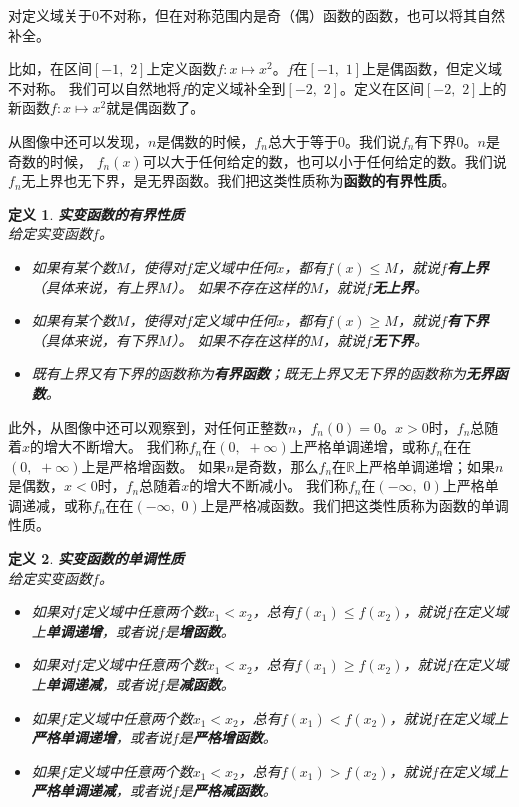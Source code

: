 \documentclass[12pt,UTF8]{ctexbook}
\newtheorem{df}{定义}[section]
\begin{document}
对定义域关于$0$不对称，但在对称范围内是奇（偶）函数的函数，也可以将其自然补全。

比如，在区间$[-1,\,\,2]$上定义函数$f: x\mapsto x^2$。$f$在$[-1,\,\,1]$上是偶函数，但定义域不对称。
我们可以自然地将$f$的定义域补全到$[-2,\,\,2]$。定义在区间$[-2,\,\,2]$上的新函数$f: x\mapsto x^2$就是偶函数了。

从图像中还可以发现，$n$是偶数的时候，$f_n$总大于等于$0$。我们说$f_n$有下界$0$。$n$是奇数的时候，
$f_n(x)$可以大于任何给定的数，也可以小于任何给定的数。我们说$f_n$无上界也无下界，是无界函数。我们把这类性质称为\textbf{函数的有界性质}。
\begin{df}\textbf{实变函数的有界性质}\\
    给定实变函数$f$。
    \begin{itemize}
        \item 如果有某个数$M$，使得对$f$定义域中任何$x$，都有$f(x)\leqslant M$，就说$f$\textbf{有上界} （具体来说，有上界$M$）。
        如果不存在这样的$M$，就说$f$\textbf{无上界}。
        \item 如果有某个数$M$，使得对$f$定义域中任何$x$，都有$f(x)\geqslant M$，就说$f$\textbf{有下界} （具体来说，有下界$M$）。
        如果不存在这样的$M$，就说$f$\textbf{无下界}。
        \item 既有上界又有下界的函数称为\textbf{有界函数}；既无上界又无下界的函数称为\textbf{无界函数}。
    \end{itemize}
\end{df}

此外，从图像中还可以观察到，对任何正整数$n$，$f_n(0) = 0$。$x>0$时，$f_n$总随着$x$的增大不断增大。
我们称$f_n$在$(0, \,\, +\infty)$上严格单调递增，或称$f_n$在在$(0, \,\, +\infty)$上是严格增函数。
如果$n$是奇数，那么$f_n$在$\mathbb{R}$上严格单调递增；如果$n$是偶数，$x<0$时，$f_n$总随着$x$的增大不断减小。
我们称$f_n$在$(-\infty,\,\, 0)$上严格单调递减，或称$f_n$在在$(-\infty,\,\, 0)$上是严格减函数。我们把这类性质称为函数的单调性质。
\begin{df}\textbf{实变函数的单调性质}\\
    给定实变函数$f$。
    \begin{itemize}
        \item 如果对$f$定义域中任意两个数$x_1 < x_2$，总有$f(x_1) \leqslant f(x_2)$，就说$f$在定义域上\textbf{单调递增}，或者说$f$是\textbf{增函数}。
        \item 如果对$f$定义域中任意两个数$x_1 < x_2$，总有$f(x_1) \geqslant f(x_2)$，就说$f$在定义域上\textbf{单调递减}，或者说$f$是\textbf{减函数}。
        \item 如果$f$定义域中任意两个数$x_1 < x_2$，总有$f(x_1) < f(x_2)$，就说$f$在定义域上\textbf{严格单调递增}，或者说$f$是\textbf{严格增函数}。
        \item 如果$f$定义域中任意两个数$x_1 < x_2$，总有$f(x_1) > f(x_2)$，就说$f$在定义域上\textbf{严格单调递减}，或者说$f$是\textbf{严格减函数}。   
    \end{itemize}
\end{df}
\end{document}
